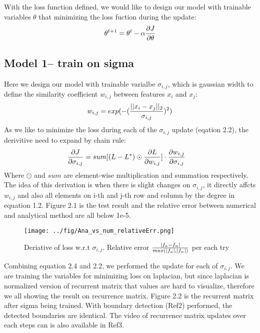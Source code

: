 \documentclass[final]{siamltexmm}
\begin{document}
With the loss function defined, we would like to design our model with trainable variables $\theta$ that minimizing the loss fuction during the update:
\begin{equation}
\theta^{t+1} = \theta^{t} - \alpha {\partial J \over \partial \theta}
\end{equation}

\subsection{Model 1-- train on sigma}
Here we design our model with trainable varialbe $\sigma_{i,j}$, which is gaussian width to define the similarity coefficient $w_{i,j}$ between features $x_i$ and $x_j$:
\begin{equation}
w_{i,j} = exp(- ({|| x_i - x_j ||_2 \over \sigma_{i,j} })^2)
\end{equation}
As we like to minimize the loss during each of the $\sigma_{i,j}$ update (eqation 2.2), the derivitive need to expand by chain rule:
\begin{equation}
\begin{aligned}
{\partial J \over \partial \sigma_{i,j}} &= sum[(L - L^{\ast}) \odot {\partial L \over \partial w_{i,j}}] \cdot {\partial w_{i,j} \over \partial \sigma_{i,j}}
\end{aligned}
\end{equation}
Where $\odot$ and $sum$ are element-wise multiplication and summation respectively. The idea of this derivation is when there is slight changes on $\sigma_{i,j}$, it directly affcts $w_{i,j}$ and also all elements on i-th and j-th row and column by the degree in equation 1.2. Figure 2.1 is the test result and the relative error between numerical and analytical method are all below 1e-5.

\begin{figure}[H]
  \centering
    \texttt{[image: ../fig/Ana\_vs\_num\_relativeErr.png]}
  \caption{Deriative of loss w.r.t $\sigma_{i,j}$. Relative error $|f_a - f_n| \over max(|f_a|, |f_n|)$ per each try}
\end{figure}

Combining equation 2.4 and 2.2, we performed the update for each of $\sigma_{i,j}$. We are training the variables for minimizing loss on laplacian, but since laplacian is normalized version of recurrent matrix that values are hard to visualize, therefore we all showing the result on recurrence matrix. Figure 2.2 is the recurrent matrix after sigma being trained. With boundary detection (Ref2) performed, the detected boundaries are identical. The video of recurrence matrix updates over each steps can is also available in Ref3.
\end{document}
